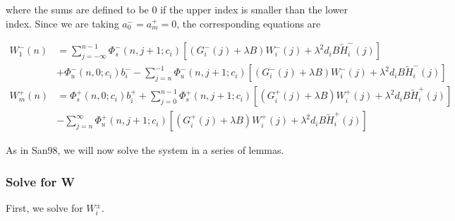 \documentclass[12pt]{article}
\begin{document}
where the sums are defined to be $0$ if the upper index is smaller than the lower index. Since we are taking $a_0^- = a_m^+ = 0$, the corresponding equations are

\begin{align*}
W_1^-(n) &= \sum_{j = -\infty}^{n-1} \Phi_s^-(n, j+1; c_i)
[(G_i^-(j) + \lambda B) W_i^-(j) + \lambda^2 d_i B \tilde{H}_i^-(j)]
 \\
&+ \Phi_u^-(n, 0; c_i) b_i^- - \sum_{j = n}^{-1} \Phi_u^-(n, j+1; c_i) 
[(G_i^-(j) + \lambda B) W_i^-(j) + \lambda^2 d_i B \tilde{H}_i^-(j)] \\
W_m^+(n) &= \Phi_s^+(n, 0; c_i) b_i^+ + \sum_{j = 0}^{n-1} \Phi_s^+(n, j+1; c_i) 
[(G_i^+(j) + \lambda B) W_i^+(j) + \lambda^2 d_i B \tilde{H}_i^+(j)] \\
&- \sum_{j = n}^{\infty} \Phi_u^+(n, j+1; c_i) 
[(G_i^+(j) + \lambda B) W_i^+(j) + \lambda^2 d_i B \tilde{H}_i^+(j)]
\end{align*}

As in San98, we will now solve the system in a series of lemmas.

\subsubsection{Solve for W}

First, we solve for $W_i^\pm$. 

\end{document}
